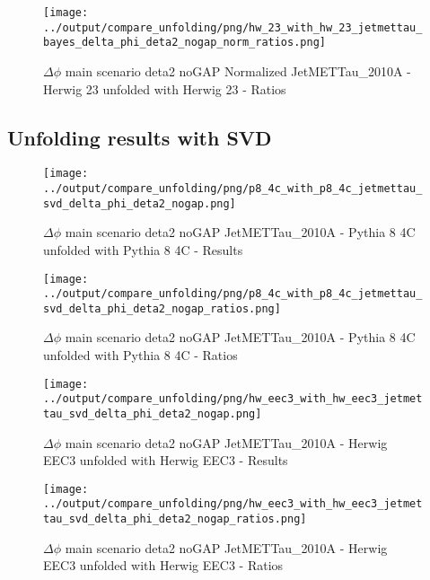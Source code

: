 \documentclass[11pt]{book}
\begin{document}
\begin{figure}[ht]
\centering
\texttt{[image: ../output/compare\_unfolding/png/hw\_23\_with\_hw\_23\_jetmettau\_bayes\_delta\_phi\_deta2\_nogap\_norm\_ratios.png]}
\caption{$\Delta\phi$ main scenario deta2 noGAP Normalized JetMETTau\_2010A - Herwig 23 unfolded with Herwig 23 - Ratios}
\label{hw_23_hw_23_jetmettau_bayes_delta_phi_deta2_nogap_norm_b}
\end{figure}



\clearpage
\subsection{Unfolding results with SVD}

\begin{figure}[ht]
\centering
\texttt{[image: ../output/compare\_unfolding/png/p8\_4c\_with\_p8\_4c\_jetmettau\_svd\_delta\_phi\_deta2\_nogap.png]}
\caption{$\Delta\phi$ main scenario deta2 noGAP JetMETTau\_2010A - Pythia 8 4C unfolded with Pythia 8 4C - Results}
\label{p8_p8_jetmettau_svd_delta_phi_deta2_nogap_a}
\end{figure}

\begin{figure}[ht]
\centering
\texttt{[image: ../output/compare\_unfolding/png/p8\_4c\_with\_p8\_4c\_jetmettau\_svd\_delta\_phi\_deta2\_nogap\_ratios.png]}
\caption{$\Delta\phi$ main scenario deta2 noGAP JetMETTau\_2010A - Pythia 8 4C unfolded with Pythia 8 4C - Ratios}
\label{p8_p8_jetmettau_svd_delta_phi_deta2_nogap_b}
\end{figure}

\begin{figure}[ht]
\centering
\texttt{[image: ../output/compare\_unfolding/png/hw\_eec3\_with\_hw\_eec3\_jetmettau\_svd\_delta\_phi\_deta2\_nogap.png]}
\caption{$\Delta\phi$ main scenario deta2 noGAP JetMETTau\_2010A - Herwig EEC3 unfolded with Herwig EEC3 - Results}
\label{hw_eec3_hw_eec3_jetmettau_svd_delta_phi_deta2_nogap_a}
\end{figure}

\begin{figure}[ht]
\centering
\texttt{[image: ../output/compare\_unfolding/png/hw\_eec3\_with\_hw\_eec3\_jetmettau\_svd\_delta\_phi\_deta2\_nogap\_ratios.png]}
\caption{$\Delta\phi$ main scenario deta2 noGAP JetMETTau\_2010A - Herwig EEC3 unfolded with Herwig EEC3 - Ratios}
\label{hw_eec3_hw_eec3_jetmettau_svd_delta_phi_deta2_nogap_b}
\end{figure}
\end{document}
